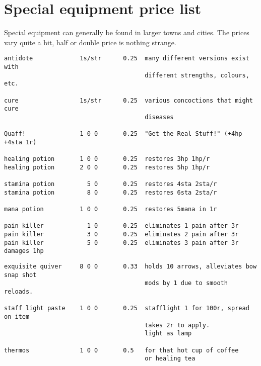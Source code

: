 
\goodbreak
{}
\section*{Special equipment price list}

Special equipment can generally be found in larger towns and cities.
The prices vary quite a bit, half or double price is nothing strange.

\small
\begin{verbatim}
antidote             1s/str      0.25  many different versions exist with
                                       different strengths, colours, etc.

cure                 1s/str      0.25  various concoctions that might cure
                                       diseases

Quaff!               1 0 0       0.25  "Get the Real Stuff!" (+4hp +4sta 1r)

healing potion       1 0 0       0.25  restores 3hp 1hp/r
healing potion       2 0 0       0.25  restores 5hp 1hp/r

stamina potion         5 0       0.25  restores 4sta 2sta/r
stamina potion         8 0       0.25  restores 6sta 2sta/r

mana potion          1 0 0       0.25  restores 5mana in 1r

pain killer            1 0       0.25  eliminates 1 pain after 3r
pain killer            3 0       0.25  eliminates 2 pain after 3r
pain killer            5 0       0.25  eliminates 3 pain after 3r damages 1hp

\end{verbatim} \goodbreak \begin{verbatim}
exquisite quiver     8 0 0       0.33  holds 10 arrows, alleviates bow snap shot
                                       mods by 1 due to smooth reloads.

staff light paste    1 0 0       0.25  stafflight 1 for 100r, spread on item
                                       takes 2r to apply.
                                       light as lamp

thermos              1 0 0       0.5   for that hot cup of coffee
                                       or healing tea


\end{verbatim}
